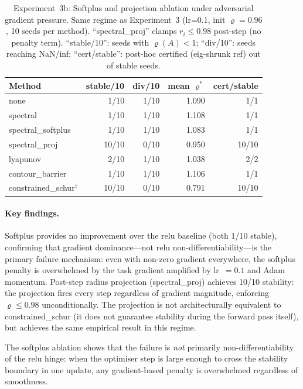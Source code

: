 \documentclass{article}
\theoremstyle{definition}
\begin{document}
\begin{table}[t]
\centering
\caption{Experiment~3b: Softplus and projection ablation under adversarial
gradient pressure.  Same regime as Experiment~3 (lr=0.1, init $\varrho=0.96$,
10 seeds per method).  ``spectral\_proj'' clamps $r_i \leq 0.98$ post-step
(no penalty term).  ``stable/10'': seeds with $\varrho(A)<1$;
``div/10'': seeds reaching NaN/inf; ``cert/stable'': post-hoc certified
(eig-shrunk ref) out of stable seeds.}
\label{tab:ablation}
\begin{tabular}{lrrrr}
\toprule
Method & stable/10 & div/10 & mean $\varrho^*$ & cert/stable \\
\midrule
none              & 1/10  & 1/10 & 1.090 & 1/1 \\
spectral          & 1/10  & 1/10 & 1.108 & 1/1 \\
spectral\_softplus & 1/10 & 1/10 & 1.083 & 1/1 \\
spectral\_proj    & 10/10 & 0/10 & 0.950 & 10/10 \\
lyapunov          & 2/10  & 1/10 & 1.038 & 2/2 \\
contour\_barrier  & 1/10  & 1/10 & 1.106 & 1/1 \\
constrained\_schur$^\dagger$ & 10/10 & 0/10 & 0.791 & 10/10 \\
\bottomrule
\end{tabular}
\end{table}

\paragraph{Key findings.}
Softplus provides no improvement over the relu baseline (both 1/10 stable),
confirming that gradient dominance---not relu non-differentiability---is the
primary failure mechanism: even with non-zero gradient everywhere, the softplus
penalty is overwhelmed by the task gradient amplified by lr~$=0.1$ and Adam
momentum.  Post-step radius projection (spectral\_proj) achieves
10/10 stability: the projection fires every step regardless of gradient
magnitude, enforcing $\varrho \leq 0.98$ unconditionally.  The projection
is not architecturally equivalent to constrained\_schur (it does not
guarantee stability during the forward pass itself), but achieves the
same empirical result in this regime.

The softplus ablation shows that the failure is \emph{not} primarily
non-differentiability of the relu hinge: when the optimiser step is large
enough to cross the stability boundary in one update, any gradient-based
penalty is overwhelmed regardless of smoothness.
\end{document}
